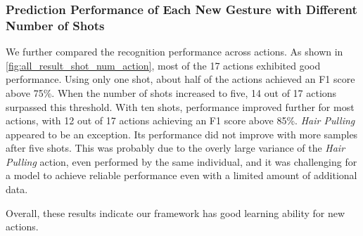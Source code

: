 



\subsubsection{Prediction Performance of Each New Gesture with Different Number of Shots}
\label{subsub:model_evaluation:pipeline_evaluation:one new gesture}


We further compared the recognition performance across actions.
As shown in \autoref{fig:all_result_shot_num_action}, most of the 17 actions exhibited good performance. Using only one shot, about half of the actions achieved an F1 score above 75\%. When the number of shots increased to five, 14 out of 17 actions surpassed this threshold. With ten shots, performance improved further for most actions, with 12 out of 17 actions achieving an F1 score above 85\%.
\textit{Hair Pulling} appeared to be an exception. Its performance did not improve with more samples after five shots. This was probably due to the overly large variance of the \textit{Hair Pulling} action, even performed by the same individual, and it was challenging for a model to achieve reliable performance even with a limited amount of additional data.

Overall, these results indicate our framework has good learning ability for new actions.





% 